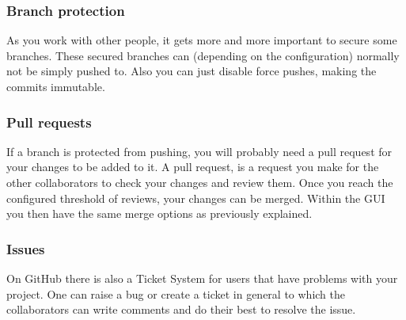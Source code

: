 \documentclass[a4paper, 12pt]{article}
\begin{document}
		\subsubsection{Branch protection}
		
			As you work with other people, it gets more and more important to secure some branches. These secured branches can (depending on the configuration) normally not be simply pushed to. Also you can just disable force pushes, making the commits immutable.
		
		\subsubsection{Pull requests}
		
			If a branch is protected from pushing, you will probably need a pull request for your changes to be added to it. A pull request, is a request you make for the other collaborators to check your changes and review them. Once you reach the configured threshold of reviews, your changes can be merged. Within the GUI you then have the same merge options as previously explained.
		
		\subsubsection{Issues}
		
			On GitHub there is also a Ticket System for users that have problems with your project. One can raise a bug or create a ticket in general to which the collaborators can write comments and do their best to resolve the issue.
\end{document}
